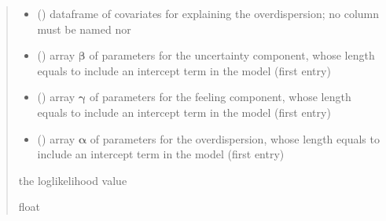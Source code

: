 \documentclass[letterpaper,10pt,english]{sphinxmanual}
\begin{document}
\begin{fulllineitems}
\begin{quote}
\begin{description}
\begin{itemize}
\item {} 
\sphinxAtStartPar
{} () \textendash{} dataframe of covariates for explaining the overdispersion;
no column must be named  nor 

\item {} 
\sphinxAtStartPar
{} () \textendash{} array \(\pmb \beta\) of parameters for the uncertainty component, whose length equals 
 to include an intercept term in the model (first entry)

\item {} 
\sphinxAtStartPar
{} () \textendash{} array \(\pmb \gamma\) of parameters for the feeling component, whose length equals 
 to include an intercept term in the model (first entry)

\item {} 
\sphinxAtStartPar
{} () \textendash{} array \(\pmb \alpha\) of parameters for the overdispersion, whose length equals 
 to include an intercept term in the model (first entry)

\end{itemize}

\sphinxAtStartPar
the log\sphinxhyphen{}likelihood value

\sphinxAtStartPar
float

\end{description}\end{quote}

\end{fulllineitems}

\end{document}
